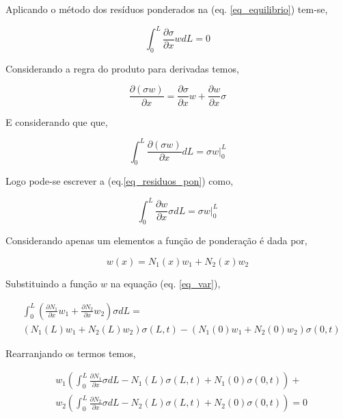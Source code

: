 \documentclass[12pt,a4paper]{article}
\newcommand{\diff}[1]{d#1}
\newcommand{\dd}[2]{\frac{\partial #1}{\partial #2}}
\begin{document}
Aplicando o método dos resíduos ponderados na (eq. \ref{eq_equilibrio}) tem-se,

\begin{equation}
\int_0^L{\dd{\sigma}{x}w\diff{L}} = 0
\label{eq_residuos_pon}
\end{equation} 

Considerando a regra do produto para derivadas temos,

\begin{equation}
\dd{(\sigma w)}{x} = \dd{\sigma}{x}w + \dd{w}{x}\sigma
\end{equation} 
 
E considerando que que,

\begin{equation}
\int_0^L \dd{(\sigma w)}{x} \diff{L} = \sigma w |_0^L
\end{equation} 
 
Logo pode-se escrever a (eq.\ref{eq_residuos_pon}) como,

\begin{equation}
\int_0^L \dd{w}{x}\sigma \diff{L} = \sigma w |_0^L
\label{eq_var}
\end{equation}

Considerando apenas um elementos a função de ponderação é dada por,

\begin{equation}
w(x) = N_1(x) w_1 + N_2(x) w_2
\end{equation} 
	
Substituindo a função $w$ na equação (eq. \ref{eq_var}),

\begin{equation}
\begin{split}
&\int_0^L \left( \dd{N_1}{x}w_1 + \dd{N_2}{x}w_2 \right)\sigma \diff{L} =\\
&\left(N_1(L) w_1 + N_2(L) w_2\right) \sigma\left(L,t\right) - \left(N_1(0) w_1 + N_2(0) w_2\right) \sigma\left(0,t\right)
\end{split}
\end{equation}
	
Rearranjando os termos temos,

\begin{equation}
\begin{split}
&w_1\left( \int_0^L \dd{N_1}{x}\sigma \diff{L} - N_1(L) \sigma\left(L,t\right) + N_1(0) \sigma\left(0,t\right) \right) +\\
&w_2\left( \int_0^L \dd{N_2}{x}\sigma \diff{L} - N_2(L) \sigma\left(L,t\right) + N_2(0) \sigma\left(0,t\right) \right) = 0
\end{split}
\end{equation}
\end{document}
